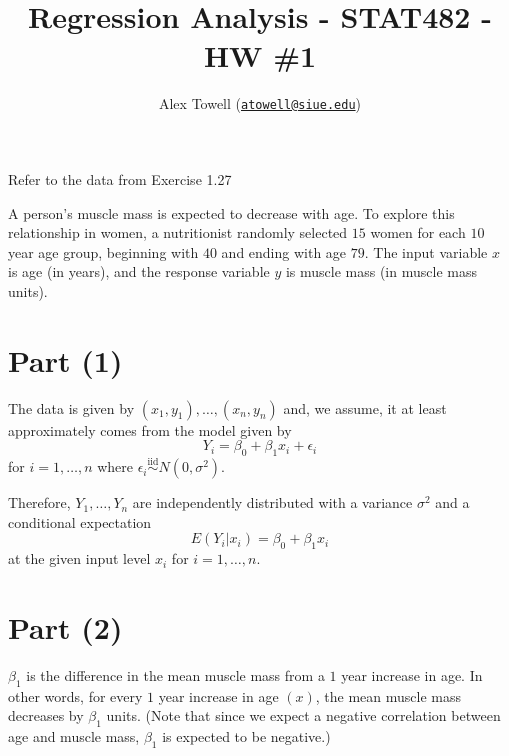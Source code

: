 \documentclass[
]{article}
\title{Regression Analysis - STAT482 - HW \#1}
\author{Alex Towell
(\href{mailto:atowell@siue.edu}{\nolinkurl{atowell@siue.edu}})}
\date{}
\begin{document}
\maketitle

\newcommand{\var}{\operatorname{Var}}
\newcommand{\expect}{\operatorname{E}}
\newcommand{\corr}{\operatorname{Corr}}
\newcommand{\cov}{\operatorname{Cov}}
\newcommand{\ssr}{\operatorname{SSR}}
\newcommand{\se}{\operatorname{SE}}
\newcommand{\mat}[1]{\mathbf{#1}}
\newcommand{\RR}{\operatorname{RR}}
\newcommand{\eval}[2]{\left. #1 \right\vert_{#2}}

Refer to the data from Exercise 1.27

A person's muscle mass is expected to decrease with age. To explore this
relationship in women, a nutritionist randomly selected \(15\) women for
each \(10\) year age group, beginning with \(40\) and ending with age
\(79\). The input variable \(x\) is age (in years), and the response
variable \(y\) is muscle mass (in muscle mass units).

\hypertarget{part-1}{%
\section{Part (1)}\label{part-1}}


The data is given by \((x_1,y_1),\ldots,(x_n,y_n)\) and, we assume, it
at least approximately comes from the model given by \[
  Y_i = \beta_0 + \beta_1 x_i + \epsilon_i
\] for \(i=1,\ldots,n\) where
\(\epsilon_i \stackrel{\text{iid}}{\sim} N(0,\sigma^2)\).

Therefore, \(Y_1,\ldots,Y_n\) are independently distributed with a
variance \(\sigma^2\) and a conditional expectation \[
  E(Y_i|x_i) = \beta_0 + \beta_1 x_i
\] at the given input level \(x_i\) for \(i=1,\ldots,n\).

\hypertarget{part-2}{%
\section{Part (2)}\label{part-2}}


\(\beta_1\) is the difference in the mean muscle mass from a \(1\) year
increase in age. In other words, for every \(1\) year increase in age
\((x)\), the mean muscle mass decreases by \(\beta_1\) units. (Note that
since we expect a negative correlation between age and muscle mass,
\(\beta_1\) is expected to be negative.)
\end{document}
